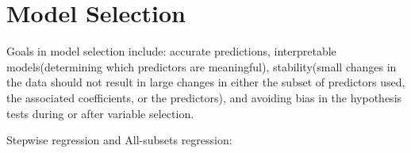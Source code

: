 \documentclass[twocolumn,10pt]{asme2e}
\begin{document}





\section{Model Selection}
Goals in model selection include: accurate predictions, interpretable models(determining which predictors are meaningful), stability(small changes in the data should not result in large changes in either the subset of predictors used, the associated coefficients, or the predictors), and avoiding bias in the hypothesis tests during or after variable selection.

Stepwise regression and All-subsets regression:
\end{document}
